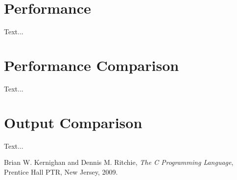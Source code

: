 \documentclass{article}
\begin{document}
\section{Performance}
Text...

\section{Performance Comparison}
Text...

\section{Output Comparison}
Text...

\begin{thebibliography}{9}

  Brian W. Kernighan and Dennis M. Ritchie,
  \emph{The C Programming Language},
  Prentice Hall PTR, New Jersey,
  2009.

\end{thebibliography}
\end{document}
